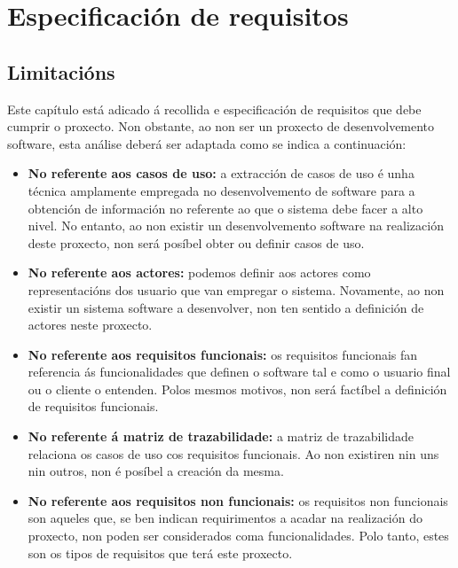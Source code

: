 \chapter{Especificación de requisitos}
\minitoc
\clearpage

\section{Limitacións}

Este capítulo está adicado á recollida e especificación de requisitos que debe cumprir o proxecto. Non obstante, ao non ser un proxecto de desenvolvemento software, esta análise deberá ser adaptada como se indica a continuación:

\begin{itemize}
    \item \textbf{No referente aos casos de uso:} a extracción de casos de uso é unha técnica amplamente empregada no desenvolvemento de software para a obtención de información no referente ao que o sistema debe facer a alto nivel. No entanto, ao non existir un desenvolvemento software na realización deste proxecto, non será posíbel obter ou definir casos de uso.
    
    \item \textbf{No referente aos actores:} podemos definir aos actores como representacións dos usuario que van empregar o sistema. Novamente, ao non existir un sistema software a desenvolver, non ten sentido a definición de actores neste proxecto.
    
    \item \textbf{No referente aos requisitos funcionais:} os requisitos funcionais fan referencia ás funcionalidades que definen o software tal e como o usuario final ou o cliente o entenden. Polos mesmos motivos, non será factíbel a definición de requisitos funcionais.
    
    \item \textbf{No referente á matriz de trazabilidade:} a matriz de trazabilidade relaciona os casos de uso cos requisitos funcionais. Ao non existiren nin uns nin outros, non é posíbel a creación da mesma.

    \item \textbf{No referente aos requisitos non funcionais:} os requisitos non funcionais son aqueles que, se ben indican requirimentos a acadar na realización do proxecto, non poden ser considerados coma funcionalidades. Polo tanto, estes son os tipos de requisitos que terá este proxecto.
\end{itemize}

